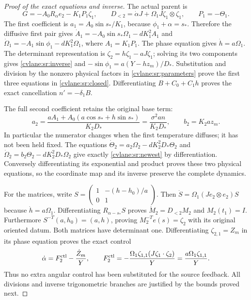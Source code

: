 \begin{proof}[Proof of the exact equations and inverse]
The actual parent is
\[
 G=-A_0R_\alpha e_2-K_1P_1\zeta_1,
 \qquad D_{<2}=\dot\alpha J+
       \Omega_1J\zeta_1\otimes\zeta_1,
 \qquad P_1=-\Theta_1.
\]
The first coefficient is $a_1=A_0\sin s_*/K_1$, because
$\phi_1+\alpha=s_*$. Therefore the diffusive first pair gives
$\dot A_1=-A_0\sin s_*\Omega_1-dK_1^2 A_1$ and
$\dot\Omega_1=-A_1\sin\phi_1-dK_1^2\Omega_1$, where
$A_1=K_1P_1$. The phase equation gives $\dot h=a\Omega_1$.
The determinant representation is $\zeta_2=h\zeta_1-aJ\zeta_1$;
solving its two components gives \eqref{cvlane:sr:inverse} and
$-\sin\phi_1=a(Y-hz_m)/D_*$. Substitution and division by the
nonzero physical factors in \eqref{cvlane:sr:parameters} prove the first
three equations in \eqref{cvlane:sr:closed}. Differentiating
$B+C_0+C_1h$ proves the exact cancellation $n'=-\delta_1B$.

The full second coefficient retains the original base term:
\[
 a_2=\frac{aA_1+A_0(a\cos s_*+h\sin s_*)}{K_2D_*}
     =\frac{\sigma^2 a n}{K_2D_*},\qquad b_2=K_2az_m.
\]
In particular the numerator changes when the first temperature
diffuses; it has not been held fixed. The equations
$\dot\Theta_2=a_2\Omega_2-dK_2^2D_*\Theta_2$ and
$\dot\Omega_2=b_2\Theta_2-dK_2^2D_*\Omega_2$ give exactly
\eqref{cvlane:sr:newest} by differentiation. Conversely differentiating its
exponential and product proves these two physical equations, so the
coordinate map and its inverse preserve the complete dynamics.

For the matrices, write $S=\left(\begin{smallmatrix}1&-(h-h_0)/a\\0&1\end{smallmatrix}\right)$.
Then $\dot S=\Omega_1(Je_2\otimes e_2)S$ because
$\dot h=a\Omega_1$. Differentiating $R_{\alpha-s_*}S$ proves
$\dot M_2=D_{<2}M_2$ and $M_2(t_1)=I$.
Furthermore $S^{-T}(a,h_0)=(a,h)$, proving
$M_2^{-T}e(s)=\zeta_2$ with its original oriented datum.
Both matrices have determinant one. Differentiating
$\zeta_{2,1}=Z_m$ in its phase equation proves the exact control
\[
 \dot\alpha=F_2^{\rm ctl}-\frac{\dot Z_m}{Y},\qquad
 F_2^{\rm ctl}=-\frac{\Omega_1\zeta_{1,1}
                       (J\zeta_1\cdot\zeta_2)}{Y}
                  =\frac{a\Omega_1\zeta_{1,1}}{Y}.
\]
Thus no extra angular control has been substituted for the source
feedback. All divisions and inverse trigonometric branches are
justified by the bounds proved next.
\end{proof}

